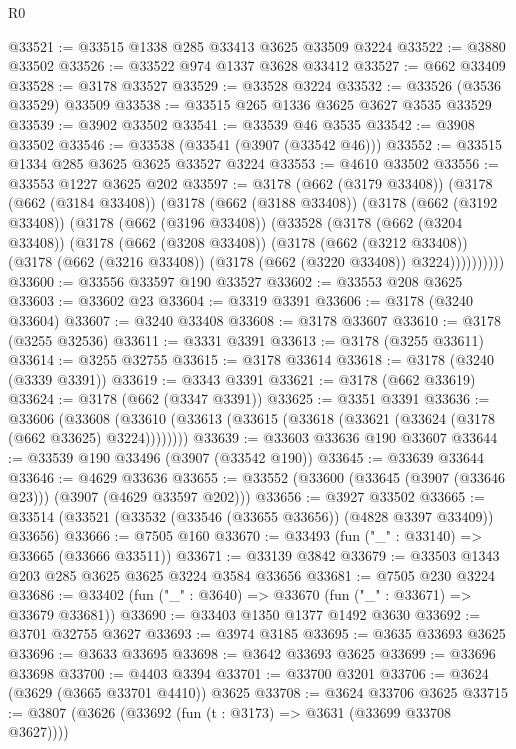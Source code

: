 \begin{lexlean}{R0}
\begin{coremodule}
@33521 := @33515 @1338 @285 @33413 @3625 @33509 @3224
@33522 := @3880 @33502
@33526 := @33522 @974 @1337 @3628 @33412
@33527 := @662 @33409
@33528 := @3178 @33527
@33529 := @33528 @3224
@33532 := @33526 (@3536 @33529) @33509
@33538 := @33515 @265 @1336 @3625 @3627 @3535 @33529
@33539 := @3902 @33502
@33541 := @33539 @46 @3535
@33542 := @3908 @33502
@33546 := @33538 (@33541 (@3907 (@33542 @46)))
@33552 := @33515 @1334 @285 @3625 @3625 @33527 @3224
@33553 := @4610 @33502
@33556 := @33553 @1227 @3625 @202
@33597 := @3178
    (@662 (@3179 @33408))
    (@3178
      (@662 (@3184 @33408))
      (@3178
        (@662 (@3188 @33408))
        (@3178
          (@662 (@3192 @33408))
          (@3178
            (@662 (@3196 @33408))
            (@33528
              (@3178
                (@662 (@3204 @33408))
                (@3178
                  (@662 (@3208 @33408))
                  (@3178
                    (@662 (@3212 @33408))
                    (@3178 (@662 (@3216 @33408)) (@3178 (@662 (@3220 @33408)) @3224))))))))))
@33600 := @33556 @33597 @190 @33527
@33602 := @33553 @208 @3625
@33603 := @33602 @23
@33604 := @3319 @3391
@33606 := @3178 (@3240 @33604)
@33607 := @3240 @33408
@33608 := @3178 @33607
@33610 := @3178 (@3255 @32536)
@33611 := @3331 @3391
@33613 := @3178 (@3255 @33611)
@33614 := @3255 @32755
@33615 := @3178 @33614
@33618 := @3178 (@3240 (@3339 @3391))
@33619 := @3343 @3391
@33621 := @3178 (@662 @33619)
@33624 := @3178 (@662 (@3347 @3391))
@33625 := @3351 @3391
@33636 := @33606
    (@33608 (@33610 (@33613 (@33615 (@33618 (@33621 (@33624 (@3178 (@662 @33625) @3224))))))))
@33639 := @33603 @33636 @190 @33607
@33644 := @33539 @190 @33496 (@3907 (@33542 @190))
@33645 := @33639 @33644
@33646 := @4629 @33636
@33655 := @33552 (@33600 (@33645 (@3907 (@33646 @23))) (@3907 (@4629 @33597 @202)))
@33656 := @3927 @33502
@33665 := @33514 (@33521 (@33532 (@33546 (@33655 @33656)) (@4828 @3397 @33409)) @33656)
@33666 := @7505 @160
@33670 := @33493 (fun ("_" : @33140) => @33665 (@33666 @33511))
@33671 := @33139 @3842
@33679 := @33503 @1343 @203 @285 @3625 @3625 @3224 @3584 @33656
@33681 := @7505 @230 @3224
@33686 := @33402 (fun ("_" : @3640) => @33670 (fun ("_" : @33671) => @33679 @33681))
@33690 := @33403 @1350 @1377 @1492 @3630
@33692 := @3701 @32755 @3627
@33693 := @3974 @3185
@33695 := @3635 @33693 @3625
@33696 := @3633 @33695
@33698 := @3642 @33693 @3625
@33699 := @33696 @33698
@33700 := @4403 @3394
@33701 := @33700 @3201
@33706 := @3624 (@3629 (@3665 @33701 @4410)) @3625
@33708 := @3624 @33706 @3625
@33715 := @3807 (@3626 (@33692 (fun (t : @3173) => @3631 (@33699 @33708 @3627))))

\end{coremodule}
\end{lexlean}
